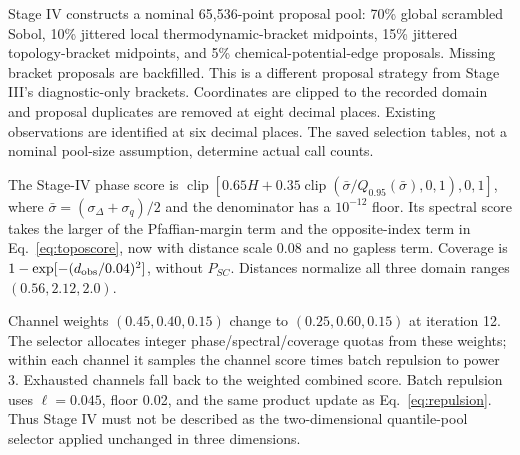 Stage IV constructs a nominal 65,536-point proposal pool: 70\% global scrambled Sobol, 10\% jittered local thermodynamic-bracket midpoints, 15\% jittered topology-bracket midpoints, and 5\% chemical-potential-edge proposals. Missing bracket proposals are backfilled. This is a different proposal strategy from Stage III's diagnostic-only brackets. Coordinates are clipped to the recorded domain and proposal duplicates are removed at eight decimal places. Existing observations are identified at six decimal places. The saved selection tables, not a nominal pool-size assumption, determine actual call counts.

The Stage-IV phase score is $\operatorname{clip}[0.65H+0.35\operatorname{clip}(\bar\sigma/Q_{0.95}(\bar\sigma),0,1),0,1]$, where $\bar\sigma=(\sigma_\Delta+\sigma_q)/2$ and the denominator has a $10^{-12}$ floor. Its spectral score takes the larger of the Pfaffian-margin term and the opposite-index term in Eq.~\eqref{eq:toposcore}, now with distance scale 0.08 and no gapless term. Coverage is $1-\exp[-(d_{\rm obs}/0.04)^2]$, without $P_{SC}$. Distances normalize all three domain ranges $(0.56,2.12,2.0)$.

Channel weights $(0.45,0.40,0.15)$ change to $(0.25,0.60,0.15)$ at iteration 12. The selector allocates integer phase/spectral/coverage quotas from these weights; within each channel it samples the channel score times batch repulsion to power 3. Exhausted channels fall back to the weighted combined score. Batch repulsion uses $\ell=0.045$, floor 0.02, and the same product update as Eq.~\eqref{eq:repulsion}. Thus Stage IV must not be described as the two-dimensional quantile-pool selector applied unchanged in three dimensions.

